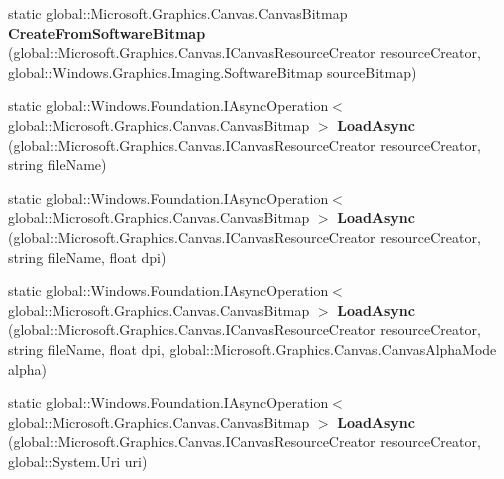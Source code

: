 \begin{DoxyCompactItemize}
static global\+::\+Microsoft.\+Graphics.\+Canvas.\+Canvas\+Bitmap {\bfseries Create\+From\+Software\+Bitmap} (global\+::\+Microsoft.\+Graphics.\+Canvas.\+I\+Canvas\+Resource\+Creator resource\+Creator, global\+::\+Windows.\+Graphics.\+Imaging.\+Software\+Bitmap source\+Bitmap)
\item 
\mbox{\label{class_microsoft_1_1_graphics_1_1_canvas_1_1_canvas_bitmap_ac19e32a381114faa58a2ff1012d712e0}} 
static global\+::\+Windows.\+Foundation.\+I\+Async\+Operation$<$ global\+::\+Microsoft.\+Graphics.\+Canvas.\+Canvas\+Bitmap $>$ {\bfseries Load\+Async} (global\+::\+Microsoft.\+Graphics.\+Canvas.\+I\+Canvas\+Resource\+Creator resource\+Creator, string file\+Name)
\item 
\mbox{\label{class_microsoft_1_1_graphics_1_1_canvas_1_1_canvas_bitmap_ab43fae45180aa4d2fad4cd9b9426416e}} 
static global\+::\+Windows.\+Foundation.\+I\+Async\+Operation$<$ global\+::\+Microsoft.\+Graphics.\+Canvas.\+Canvas\+Bitmap $>$ {\bfseries Load\+Async} (global\+::\+Microsoft.\+Graphics.\+Canvas.\+I\+Canvas\+Resource\+Creator resource\+Creator, string file\+Name, float dpi)
\item 
\mbox{\label{class_microsoft_1_1_graphics_1_1_canvas_1_1_canvas_bitmap_afef79684594ac3ba07cf8cf01939165c}} 
static global\+::\+Windows.\+Foundation.\+I\+Async\+Operation$<$ global\+::\+Microsoft.\+Graphics.\+Canvas.\+Canvas\+Bitmap $>$ {\bfseries Load\+Async} (global\+::\+Microsoft.\+Graphics.\+Canvas.\+I\+Canvas\+Resource\+Creator resource\+Creator, string file\+Name, float dpi, global\+::\+Microsoft.\+Graphics.\+Canvas.\+Canvas\+Alpha\+Mode alpha)
\item 
\mbox{\label{class_microsoft_1_1_graphics_1_1_canvas_1_1_canvas_bitmap_a29af06676a85a4ad0adfc9e766d96ae1}} 
static global\+::\+Windows.\+Foundation.\+I\+Async\+Operation$<$ global\+::\+Microsoft.\+Graphics.\+Canvas.\+Canvas\+Bitmap $>$ {\bfseries Load\+Async} (global\+::\+Microsoft.\+Graphics.\+Canvas.\+I\+Canvas\+Resource\+Creator resource\+Creator, global\+::\+System.\+Uri uri)
\item 
\mbox{\label{class_microsoft_1_1_graphics_1_1_canvas_1_1_canvas_bitmap_a18f1f34916c8b70dc7ff8d8044e0ba43}} 

\end{DoxyCompactItemize}
